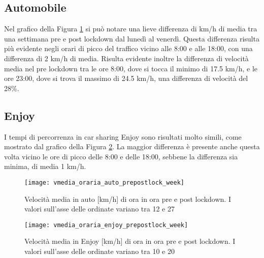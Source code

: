 \subsection{Automobile}

Nel grafico della Figura \ref{image:22} si può notare una lieve differenza di km/h di media tra una settimana pre e post lockdown dal lunedì al venerdì. Questa differenza risulta più evidente negli orari di picco del traffico vicino alle 8:00 e alle 18:00, con una differenza di 2 km/h di media. Risulta evidente inoltre la differenza di velocità media nel pre lockdown tra le ore 8:00, dove si tocca il minimo di 17.5 km/h, e le ore 23:00, dove si trova il massimo di 24.5 km/h, una differenza di velocità del 28\%.

\subsection{Enjoy}

I tempi di percorrenza in car sharing Enjoy sono risultati molto simili, come mostrato dal grafico della Figura \ref{image:24}. La maggior differenza è presente anche questa volta vicino le ore di picco delle 8:00 e delle 18:00, sebbene la differenza sia minima, di media 1 km/h.

\begin{figure}[H]
	\centering
	\texttt{[image: vmedia\_oraria\_auto\_prepostlock\_week]}
	\caption{Velocità media in auto [km/h] di ora in ora pre e post lockdown. I valori sull'asse delle ordinate variano tra 12 e 27}
	\label{image:22}
\end{figure}

\begin{figure}[H]
	\centering
	\texttt{[image: vmedia\_oraria\_enjoy\_prepostlock\_week]}
	\caption{Velocità media in Enjoy [km/h] di ora in ora pre e post lockdown. I valori sull'asse delle ordinate variano tra 10 e 20}
	\label{image:24}
\end{figure}












